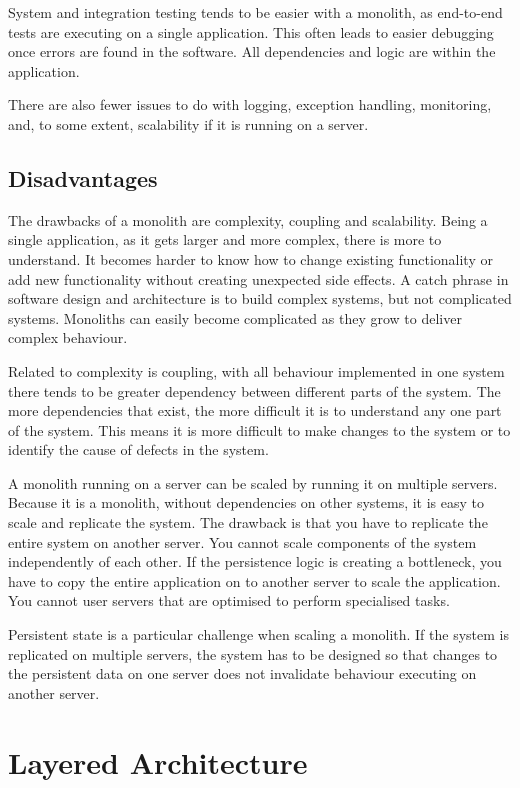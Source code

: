 System and integration testing tends to be easier with a monolith, as end-to-end tests are executing on a single application.
This often leads to easier debugging once errors are found in the software.
All dependencies and logic are within the application.	

There are also fewer issues to do with logging, exception handling, monitoring,
and, to some extent, scalability if it is running on a server.

\subsection{Disadvantages}

The drawbacks of a monolith are complexity, coupling and scalability.
Being a single application, as it gets larger and more complex, there is more to understand.
It becomes harder to know how to change existing functionality or add new functionality without creating unexpected side effects.
A catch phrase in software design and architecture is to build complex systems, but not complicated systems.
Monoliths can easily become complicated as they grow to deliver complex behaviour.

Related to complexity is coupling, with all behaviour implemented in one system
there tends to be greater dependency between different parts of the system.
The more dependencies that exist, the more difficult it is to understand any one part of the system.
This means it is more difficult to make changes to the system or to identify the cause of defects in the system.

A monolith running on a server can be scaled by running it on multiple servers.
Because it is a monolith, without dependencies on other systems, it is easy to scale and replicate the system.
The drawback is that you have to replicate the entire system on another server.
You cannot scale components of the system independently of each other.
If the persistence logic is creating a bottleneck, you have to copy the entire application on to another server to scale the application.
You cannot user servers that are optimised to perform specialised tasks.

Persistent state is a particular challenge when scaling a monolith.
If the system is replicated on multiple servers,
the system has to be designed so that changes to the persistent data on one server
does not invalidate behaviour executing on another server.


\section{Layered Architecture}

